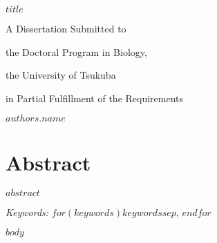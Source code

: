 \documentclass[12pt, a4paper]{report} %
\begin{document}
\def\spacingset#1{\renewcommand{\baselinestretch}%
{#1}\small\normalsize} \spacingset{1}


%


    \thispagestyle{empty}
    \vspace*{30mm}
    \begin{center}
    \LARGE{\bf $title$}
    \end{center}

    \vspace{6cm}
    \centerline{A Dissertation Submitted to}\par
    \centerline{the Doctoral Program in Biology,}\par
    \centerline{the University of Tsukuba}\par
    \centerline{in Partial Fulfillment of the Requirements}\par

    \vspace{2cm}
    \centerline{\Large{\bf $authors.name$}}
    \clearpage



\newpage

\chapter*{Abstract}
$abstract$

\noindent%
{\it Keywords:} $for(keywords)$$keywords$$sep$, $endfor$
\vfill

\newpage
\spacingset{1.45} %

$body$



\end{document}
